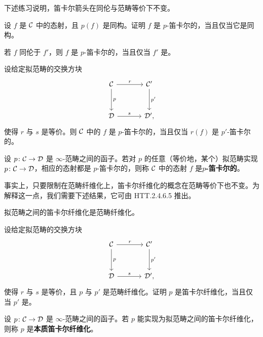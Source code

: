 \nitem\label{L19-2.10} 下述练习说明，笛卡尔箭头在同伦与范畴等价下不变。

\begin{exercise}\label{L19-2.11}
设 $f$ 是 $\mathcal{C}$ 中的态射，且 $p(f)$ 是同构。证明 $f$ 是 $p$-笛卡尔的，当且仅当它是同构。
\end{exercise}

\begin{exercise}\label{L19-2.12}
若 $f$ 同伦于 $f'$，则 $f$ 是 $p$-笛卡尔的，当且仅当 $f'$ 是。
\end{exercise}

\begin{exercise}\label{L19-2.13}
设给定拟范畴的交换方块
\[
\begin{tikzcd}[column sep=3.4em,row sep=3em]
\cC \arrow[r,"r"] \arrow[d,"p"] & \cC' \arrow[d,"p'"]\\
\cD \arrow[r,"s"] & \cD',
\end{tikzcd}
\]
使得 $r$ 与 $s$ 是等价。则 $\mathcal{C}$ 中的 $f$ 是 $p$-笛卡尔的，当且仅当 $r(f)$ 是 $p'$-笛卡尔的。
\end{exercise}

\begin{definition}\label{L19-2.14}
设 $p\colon\mathcal{C}\to\mathcal{D}$ 是 $\infty$-范畴之间的函子。若对 $p$ 的任意（等价地，某个）拟范畴实现 $p\colon\mathcal{C}\to\mathcal{D}$，相应的态射都是 $p$-笛卡尔的，则称 $\mathcal{C}$ 中的态射 $f$ 是\textbf{$p$-笛卡尔的}。
\end{definition}

\nitem\label{L19-2.15} 事实上，只要限制在范畴纤维化上，笛卡尔纤维化的概念在范畴等价下也不变。为解释这一点，我们需要下述结果，它可由 HTT.2.4.6.5 推出。

\begin{proposition}\label{L19-2.16}
拟范畴之间的笛卡尔纤维化是范畴纤维化。
\end{proposition}

\begin{exercise}\label{L19-2.17}
设给定拟范畴的交换方块
\[
\begin{tikzcd}[column sep=3.4em,row sep=3em]
\cC \arrow[r,"r"] \arrow[d,"p"] & \cC' \arrow[d,"p'"]\\
\cD \arrow[r,"s"] & \cD',
\end{tikzcd}
\]
使得 $r$ 与 $s$ 是等价，且 $p$ 与 $p'$ 是范畴纤维化。证明 $p$ 是笛卡尔纤维化，当且仅当 $p'$ 是。
\end{exercise}

\begin{definition}\label{L19-2.18}
设 $p\colon\mathcal{C}\to\mathcal{D}$ 是 $\infty$-范畴之间的函子。若 $p$ 能实现为拟范畴之间的笛卡尔纤维化，则称 $p$ 是\textbf{本质笛卡尔纤维化}。
\end{definition}


